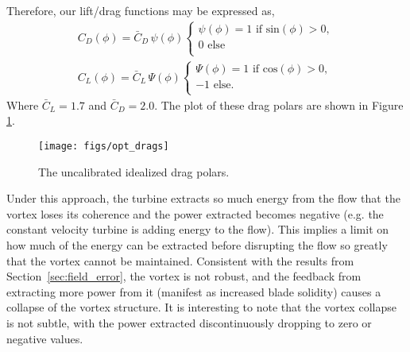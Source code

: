 Therefore, our lift/drag functions may be expressed as,
\begin{align*} 
 C_D(\phi) = \bar C_D \, \psi(\phi) 
  \begin{cases}
   \psi(\phi) = 1 \text{ if sin}(\phi) > 0,   \\
   0 \text{ else} \\
  \end{cases} \\
 C_L(\phi) = \bar C_L \, \Psi(\phi) 
  \begin{cases}
   \Psi(\phi) = 1 \text{ if cos}(\phi) > 0,   \\
   -1 \text{ else}. \\
  \end{cases}
\end{align*}
Where $\bar C_L = 1.7$ and $\bar C_D = 2.0$. The plot of these drag
polars are shown in Figure \ref{drags}. 

\begin{figure}[!htb]
  \begin{center}
    \texttt{[image: figs/opt\_drags]}
    \caption{The uncalibrated idealized drag polars.} 
    \label{drags}
  \end{center}
\end{figure}


Under this approach, the turbine extracts so much energy from the flow
that the vortex loses its coherence and the power extracted becomes
negative (e.g. the constant velocity turbine is adding energy to the
flow).
This implies a limit on how much of the energy can be extracted before
disrupting the flow so greatly that the vortex cannot be maintained.   
Consistent with the results from Section~\ref{sec:field_error},
the vortex is not robust, and the feedback from extracting more power
from it (manifest as increased blade solidity) causes a collapse of the
vortex structure. It is interesting to note that the vortex collapse is
not subtle, with the power extracted discontinuously dropping to zero or
negative values. 

